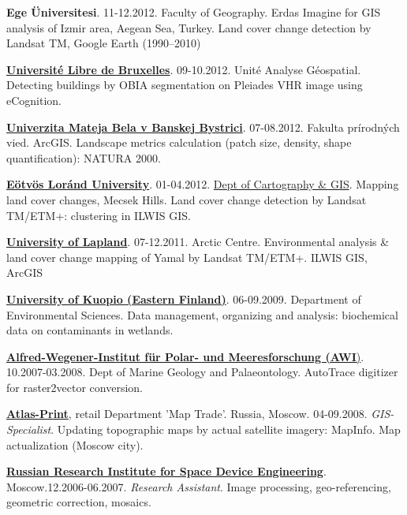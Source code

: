 \documentclass[10pt]{article}
\begin{document}
\textbf{Ege \"{U}niversitesi}. 11-12.2012. Faculty of Geography. Erdas Imagine for GIS analysis of Izmir area, Aegean Sea, Turkey. Land cover change detection by Landsat TM, Google Earth (1990–2010)
\vspace{5pt}

\href{http://www.ulb.ac.be/}{\textbf{Universit\'e Libre de Bruxelles}}. 09-10.2012. Unit\'e Analyse G\'eospatial. Detecting buildings by OBIA segmentation on Pleiades VHR image using eCognition.
\vspace{5pt}

\href{http://www.umb.sk/umb/umbbb.nsf}{\textbf{Univerzita Mateja Bela v Banskej Bystrici}}. 07-08.2012. Fakulta prírodných vied. ArcGIS. Landscape metrics calculation (patch size, density, shape quantification): NATURA 2000.
\vspace{5pt}

\href{http://www.elte.hu/}{\textbf{E\"otv\"os Lor\'and University}}. 01-04.2012. \href{http://lazarus.elte.hu/}{Dept of Cartography \& GIS}. Mapping land cover changes, Mecsek Hills. Land cover change detection by Landsat TM/ETM+: clustering in ILWIS GIS.
\vspace{5pt}

\href{http://www.arcticcentre.org/InEnglish.iw3}{\textbf{University of Lapland}}. 07-12.2011. Arctic Centre. Environmental analysis \& land cover change mapping of Yamal by Landsat TM/ETM+. ILWIS GIS, ArcGIS
\vspace{5pt}

\href{http://www.uef.fi/tutustu}{\textbf{University of Kuopio (Eastern Finland)}}. 06-09.2009. Department of Environmental Sciences. Data management, organizing and analysis: biochemical data on contaminants in wetlands.
\vspace{5pt}

\href{https://www.awi.de/}{\textbf{Alfred-Wegener-Institut f\"{u}r Polar- und Meeresforschung (AWI})}. 10.2007-03.2008. Dept of Marine Geology and Palaeontology. AutoTrace digitizer for raster2vector conversion. 
\vspace{5pt}

\href{http://atlas-print.ru/}{\textbf{Atlas-Print}}, retail Department 'Map Trade'. Russia, Moscow. 04-09.2008. \textit{GIS-Specialist}. Updating topographic maps by actual satellite imagery: MapInfo. Map actualization (Moscow city).
\vspace{5pt}

\href{http://www.rniikp.ru/}{\textbf{Russian Research Institute for Space Device Engineering}}. Moscow.12.2006-06.2007. \textit{Research Assistant}. Image processing, geo-referencing, geometric correction, mosaics.
\vspace{5pt}
\end{document}
